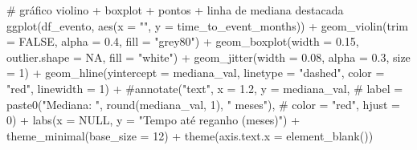 \documentclass[
]{article}
\newenvironment{Shaded}{\begin{snugshade}}{\end{snugshade}}
\newcommand{\AttributeTok}[1]{\textcolor[rgb]{0.40,0.45,0.13}{#1}}
\newcommand{\CommentTok}[1]{\textcolor[rgb]{0.37,0.37,0.37}{#1}}
\newcommand{\ConstantTok}[1]{\textcolor[rgb]{0.56,0.35,0.01}{#1}}
\newcommand{\DecValTok}[1]{\textcolor[rgb]{0.68,0.00,0.00}{#1}}
\newcommand{\FloatTok}[1]{\textcolor[rgb]{0.68,0.00,0.00}{#1}}
\newcommand{\FunctionTok}[1]{\textcolor[rgb]{0.28,0.35,0.67}{#1}}
\newcommand{\NormalTok}[1]{\textcolor[rgb]{0.00,0.23,0.31}{#1}}
\newcommand{\SpecialCharTok}[1]{\textcolor[rgb]{0.37,0.37,0.37}{#1}}
\newcommand{\StringTok}[1]{\textcolor[rgb]{0.13,0.47,0.30}{#1}}
\begin{document}
\begin{Shaded}
\begin{Highlighting}[]
\CommentTok{\# gráfico violino + boxplot + pontos + linha de mediana destacada}
\FunctionTok{ggplot}\NormalTok{(df\_evento, }\FunctionTok{aes}\NormalTok{(}\AttributeTok{x =} \StringTok{""}\NormalTok{, }\AttributeTok{y =}\NormalTok{ time\_to\_event\_months)) }\SpecialCharTok{+}
  \FunctionTok{geom\_violin}\NormalTok{(}\AttributeTok{trim =} \ConstantTok{FALSE}\NormalTok{, }\AttributeTok{alpha =} \FloatTok{0.4}\NormalTok{, }\AttributeTok{fill =} \StringTok{"grey80"}\NormalTok{) }\SpecialCharTok{+}
  \FunctionTok{geom\_boxplot}\NormalTok{(}\AttributeTok{width =} \FloatTok{0.15}\NormalTok{, }\AttributeTok{outlier.shape =} \ConstantTok{NA}\NormalTok{, }\AttributeTok{fill =} \StringTok{"white"}\NormalTok{) }\SpecialCharTok{+}
  \FunctionTok{geom\_jitter}\NormalTok{(}\AttributeTok{width =} \FloatTok{0.08}\NormalTok{, }\AttributeTok{alpha =} \FloatTok{0.3}\NormalTok{, }\AttributeTok{size =} \DecValTok{1}\NormalTok{) }\SpecialCharTok{+}
  \FunctionTok{geom\_hline}\NormalTok{(}\AttributeTok{yintercept =}\NormalTok{ mediana\_val, }\AttributeTok{linetype =} \StringTok{"dashed"}\NormalTok{, }\AttributeTok{color =} \StringTok{"red"}\NormalTok{, }\AttributeTok{linewidth =} \DecValTok{1}\NormalTok{) }\SpecialCharTok{+}
  \CommentTok{\#annotate("text", x = 1.2, y = mediana\_val,}
  \CommentTok{\#         label = paste0("Mediana: ", round(mediana\_val, 1), " meses"),}
  \CommentTok{\#         color = "red", hjust = 0) +}
  \FunctionTok{labs}\NormalTok{(}\AttributeTok{x =} \ConstantTok{NULL}\NormalTok{, }\AttributeTok{y =} \StringTok{"Tempo até reganho (meses)"}\NormalTok{) }\SpecialCharTok{+}
  \FunctionTok{theme\_minimal}\NormalTok{(}\AttributeTok{base\_size =} \DecValTok{12}\NormalTok{) }\SpecialCharTok{+}
  \FunctionTok{theme}\NormalTok{(}\AttributeTok{axis.text.x =} \FunctionTok{element\_blank}\NormalTok{())}
\end{Highlighting}
\end{Shaded}
\end{document}
